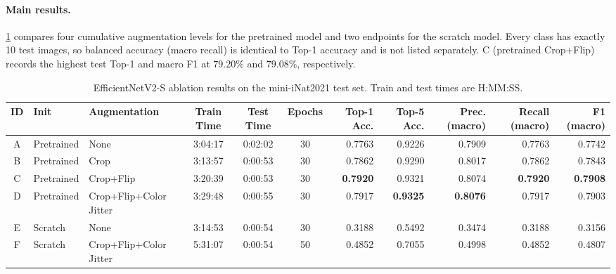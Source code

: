 \paragraph{Main results.}
\cref{tab:efficientnetv2-results} compares four cumulative augmentation levels for the pretrained model and two endpoints for the scratch model. Every class has exactly 10 test images, so balanced accuracy (macro recall) is identical to Top-1 accuracy and is not listed separately. C (pretrained Crop+Flip) records the highest test Top-1 and macro F1 at $79.20\%$ and $79.08\%$, respectively.

\begin{table}[t]
  \centering
  \caption{EfficientNetV2-S ablation results on the mini-iNat2021 test set. Train and test times are H:MM:SS.}
  \label{tab:efficientnetv2-results}
  \setlength{\tabcolsep}{2.8pt}
  \scriptsize
  \begin{tabular}{@{}cllcccrrrrr@{}}
    \toprule
    ID & Init       & Augmentation           & Train Time & Test Time & Epochs & Top-1 Acc.      & Top-5 Acc.      & Prec. (macro)   & Recall (macro)  & F1 (macro)      \\
    \midrule
    A  & Pretrained & None                   & 3:04:17    & 0:02:02   & 30     & 0.7763          & 0.9226          & 0.7909          & 0.7763          & 0.7742          \\
    B  & Pretrained & Crop                   & 3:13:57    & 0:00:53   & 30     & 0.7862          & 0.9290          & 0.8017          & 0.7862          & 0.7843          \\
    C  & Pretrained & Crop+Flip              & 3:20:39    & 0:00:53   & 30     & \textbf{0.7920} & 0.9321          & 0.8074          & \textbf{0.7920} & \textbf{0.7908} \\
    D  & Pretrained & Crop+Flip+Color Jitter & 3:29:48    & 0:00:55   & 30     & 0.7917          & \textbf{0.9325} & \textbf{0.8076} & 0.7917          & 0.7903          \\
    E  & Scratch    & None                   & 3:14:53    & 0:00:54   & 30     & 0.3188          & 0.5492          & 0.3474          & 0.3188          & 0.3156          \\
    F  & Scratch    & Crop+Flip+Color Jitter & 5:31:07    & 0:00:54   & 50     & 0.4852          & 0.7055          & 0.4998          & 0.4852          & 0.4807          \\
    \bottomrule
  \end{tabular}
\end{table}

